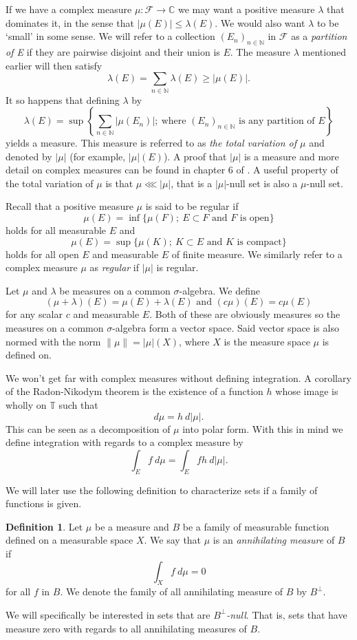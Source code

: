 \documentclass[a4paper,12pt,twoside,BCOR=10mm]{scrbook}
\theoremstyle{definition}
\theoremstyle{definition}
\theoremstyle{definition}
\newtheorem{definition}[theorem]{Definition}
\begin{document}
If we have a complex measure $\mu: \mathcal{F} \rightarrow \mathbb{C}$ we may want a positive measure $\lambda$ that dominates it, in the sense that $|\mu(E)| \leq \lambda(E)$.
We would also want $\lambda$ to be `small' in some sense.
We will refer to a collection $(E_n)_{n \in \mathbb{N}}$ in $\mathcal{F}$ as a \emph{partition of E} if they are pairwise disjoint and their union is $E$.
The measure $\lambda$ mentioned earlier will then satisfy
\[
	\lambda(E) = \sum_{n \in \mathbb{N}} \lambda(E) \geq |\mu(E)|.
\]
It so happens that defining $\lambda$ by
\[
	\lambda(E) = \sup \left \{\sum_{n \in \mathbb{N}}|\mu(E_n)|;\ \text{where }(E_n)_{n \in \mathbb{N}}\text{ is any partition of }E \right \}
\]
yields a measure.
This measure is referred to as \emph{the total variation of $\mu$} and denoted by $|\mu|$ (for example, $|\mu|(E)$).
A proof that $|\mu|$ is a measure and more detail on complex measures can be found in chapter $6$ of \citep{rudin2}. 
A useful property of the total variation of $\mu$ is that $\mu \lll |\mu|$, that is a $|\mu|$-null set is also a $\mu$-null set.

Recall that a positive measure $\mu$ is said to be regular if
\[
	\mu(E) = \inf\{\mu(F);\ E \subset F \text{ and $F$ is open}\}
\]
holds for all measurable $E$ and
\[
	\mu(E) = \sup\{\mu(K);\ K \subset E \text{ and $K$ is compact}\}
\]
holds for all open $E$ and measurable $E$ of finite measure.
We similarly refer to a complex measure $\mu$ as \emph{regular} if $|\mu|$ is regular.

Let $\mu$ and $\lambda$ be measures on a common $\sigma$-algebra.
We define
\[
	(\mu + \lambda)(E) = \mu(E) + \lambda(E) \text{ and } (c\mu)(E) = c\mu(E)
\]
for any scalar $c$ and measurable $E$.
Both of these are obviously measures so the measures on a common $\sigma$-algebra form a vector space.
Said vector space is also normed with the norm $\|\mu\| = |\mu|(X)$, where $X$ is the measure space $\mu$ is defined on.

We won't get far with complex measures without defining integration.
A corollary of the Radon-Nikodym theorem is the existence of a function $h$ whose image is wholly on $\mathbb{T}$ such that
\[
	d\mu = h\ d|\mu|.
\]
This can be seen as a decomposition of $\mu$ into polar form.
With this in mind we define integration with regards to a complex measure by
\[
	\int_E f\ d\mu = \int_E fh\ d|\mu|.
\]

We will later use the following definition to characterize sets if a family of functions is given.
\begin{definition}
\label{annilatingmeasure}
Let $\mu$ be a measure and $B$ be a family of measurable function defined on a measurable space $X$.
We say that $\mu$ is an \emph{annihilating measure} of $B$ if
\[
	\int_X f\ d\mu = 0
\]
for all $f$ in $B$. We denote the family of all annihilating measure of $B$ by $B^{\bot}$.
\end{definition}
We will specifically be interested in sets that are \emph{$B^{\bot}$-null}.
That is, sets that have measure zero with regards to all annihilating measures of $B$.
\end{document}
